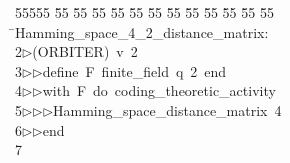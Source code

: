 %
%
\begin{tabbing}
55555 \= 55 \= 55 \= 55 \= 55 \= 55 \= 55 \= 55 \= 55 \= 55 \= 55 \= 55 \= 55 \= \>Hamming\_space\_4\_2\_distance\_matrix:\\[0pt]
2\>$\triangleright$\>(ORBITER)\ v\ 2\ \\[0pt]
3\>$\triangleright$\>$\triangleright$\>define\ F\ finite\_field\ q\ 2\ end\ \\[0pt]
4\>$\triangleright$\>$\triangleright$\>with\ F\ do\ coding\_theoretic\_activity\ \\[0pt]
5\>$\triangleright$\>$\triangleright$\>$\triangleright$\>Hamming\_space\_distance\_matrix\ 4\ \\[0pt]
6\>$\triangleright$\>$\triangleright$\>end\\[0pt]
7\>\end{tabbing}
